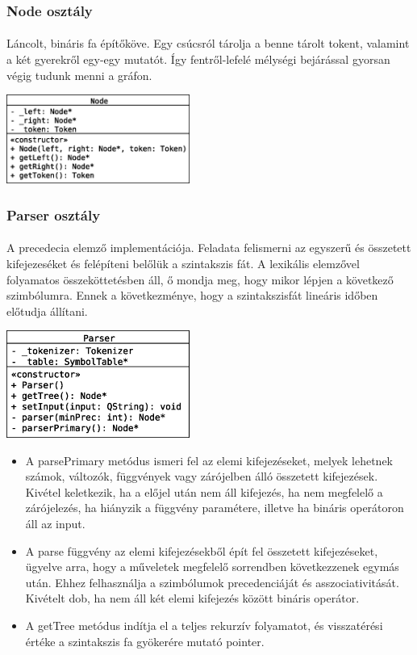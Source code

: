 \documentclass[12pt]{report}
\begin{document}
\subsubsection{Node osztály}
\paragraph{}
Láncolt, bináris fa építőköve. Egy csúcsról tárolja a benne tárolt tokent, valamint a két gyerekről egy-egy mutatót. Így fentről-lefelé mélységi bejárással gyorsan végig tudunk menni a gráfon.
\begin{center}
\includegraphics[width=6cm]{pics/uml/Node}
\end{center}
\subsubsection{Parser osztály}
\paragraph{}
A precedecia elemző implementációja. Feladata felismerni az egyszerű és összetett kifejezeséket és felépíteni belőlük a szintakszis fát. A lexikális elemzővel folyamatos összeköttetésben áll, ő mondja meg, hogy mikor lépjen a következő szimbólumra. Ennek a következménye, hogy a szintakszisfát lineáris időben előtudja állítani.
\begin{center}
\includegraphics[width=6cm]{pics/uml/Parser}
\end{center}
\begin{itemize}
\item A parsePrimary metódus ismeri fel az elemi kifejezéseket, melyek lehetnek számok, változók, függvények vagy zárójelben álló összetett kifejezések. Kivétel keletkezik, ha a előjel után nem áll kifejezés, ha nem megfelelő a zárójelezés, ha hiányzik a függvény paramétere, illetve ha bináris operátoron áll az input.
\item A parse függvény az elemi kifejezésekből épít fel összetett kifejezéseket, ügyelve arra, hogy a műveletek megfelelő sorrendben következzenek egymás után. Ehhez felhasználja a szimbólumok precedenciáját és asszociativitását. Kivételt dob, ha nem áll két elemi kifejezés között bináris operátor.
\item A getTree metódus indítja el a teljes rekurzív folyamatot, és visszatérési értéke a szintakszis fa gyökerére mutató pointer. 
\end{itemize}
\end{document}
